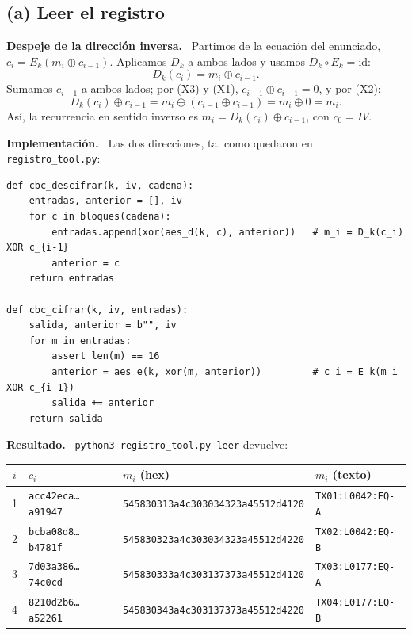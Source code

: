 \documentclass[11pt,letterpaper]{article}
\newcommand{\xor}{\oplus}
\newcommand{\paso}[1]{\par\smallskip\noindent\textbf{#1.}\ }
\begin{document}
\subsection*{(a) Leer el registro}

\paso{Despeje de la dirección inversa}
Partimos de la ecuación del enunciado, $c_i = E_k(m_i\xor c_{i-1})$. Aplicamos $D_k$ a ambos
lados y usamos $D_k\circ E_k=\mathrm{id}$:
\[
  D_k(c_i) = m_i \xor c_{i-1}.
\]
Sumamos $c_{i-1}$ a ambos lados; por (X3) y (X1), $c_{i-1}\xor c_{i-1}=0$, y por (X2):
\[
  D_k(c_i)\xor c_{i-1} = m_i\xor (c_{i-1}\xor c_{i-1}) = m_i \xor 0 = m_i .
\]
Así, la recurrencia en sentido inverso es $m_i = D_k(c_i)\xor c_{i-1}$, con $c_0=IV$.

\paso{Implementación} Las dos direcciones, tal como quedaron en \texttt{registro\_tool.py}:
\begin{lstlisting}[style=py]
def cbc_descifrar(k, iv, cadena):
    entradas, anterior = [], iv
    for c in bloques(cadena):
        entradas.append(xor(aes_d(k, c), anterior))   # m_i = D_k(c_i) XOR c_{i-1}
        anterior = c
    return entradas

def cbc_cifrar(k, iv, entradas):
    salida, anterior = b"", iv
    for m in entradas:
        assert len(m) == 16
        anterior = aes_e(k, xor(m, anterior))         # c_i = E_k(m_i XOR c_{i-1})
        salida += anterior
    return salida
\end{lstlisting}

\paso{Resultado} \texttt{python3 registro\_tool.py leer} devuelve:

\begin{center}
\begin{tabular}{clll}
\toprule
$i$ & $c_i$ & $m_i$ (hex) & $m_i$ (texto) \\
\midrule
1 & \texttt{acc42eca\ldots a91947} & \texttt{545830313a4c303034323a45512d4120} & \texttt{TX01:L0042:EQ-A\textvisiblespace} \\
2 & \texttt{bcba08d8\ldots b4781f} & \texttt{545830323a4c303034323a45512d4220} & \texttt{TX02:L0042:EQ-B\textvisiblespace} \\
3 & \texttt{7d03a386\ldots 74c0cd} & \texttt{545830333a4c303137373a45512d4120} & \texttt{TX03:L0177:EQ-A\textvisiblespace} \\
4 & \texttt{8210d2b6\ldots a52261} & \texttt{545830343a4c303137373a45512d4220} & \texttt{TX04:L0177:EQ-B\textvisiblespace} \\
\bottomrule
\end{tabular}
\end{center}
\end{document}
